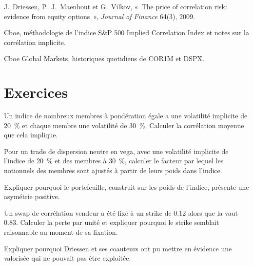 \begin{omsources}
\item J.~Driessen, P.~J.~Maenhout et G.~Vilkov, «~The price of correlation risk: evidence from equity options~», \emph{Journal of Finance} 64(3), 2009.
\item Cboe, méthodologie de l'indice S\&P 500 Implied Correlation Index et notes sur la corrélation implicite.
\item Cboe Global Markets, historiques quotidiens de COR1M et DSPX.
\end{omsources}

\section{Exercices}

\begin{exercise}[$\star$]\label{exo:s2:dispersion-and-correlation:1}
Un indice de nombreux membres à pondération égale a une volatilité implicite de 20~\% et chaque membre une volatilité de 30~\%. Calculer la corrélation moyenne que cela implique.
\end{exercise}

\begin{exercise}[$\star$]\label{exo:s2:dispersion-and-correlation:2}
Pour un trade de dispersion neutre en vega, avec une volatilité implicite de l'indice de 20~\% et des membres à 30~\%, calculer le facteur par lequel les notionnels des membres
sont ajustés à partir de leurs poids dans l'indice.
\end{exercise}

\begin{exercise}[$\star$]\label{exo:s2:dispersion-and-correlation:3}
Expliquer pourquoi le portefeuille, construit sur les poids de l'indice, présente une asymétrie positive.
\end{exercise}

\begin{exercise}[$\star\star$]\label{exo:s2:dispersion-and-correlation:4}
Un swap de corrélation vendeur a été fixé à un strike de 0.12 alors que la  vaut 0.83. Calculer la perte par unité et expliquer pourquoi le strike semblait raisonnable au moment de sa fixation.
\end{exercise}

\begin{exercise}[$\star\star$]\label{exo:s2:dispersion-and-correlation:5}
Expliquer pourquoi Driessen et ses coauteurs ont pu mettre en évidence une  valorisée qui ne pouvait pas être exploitée.
\end{exercise}

